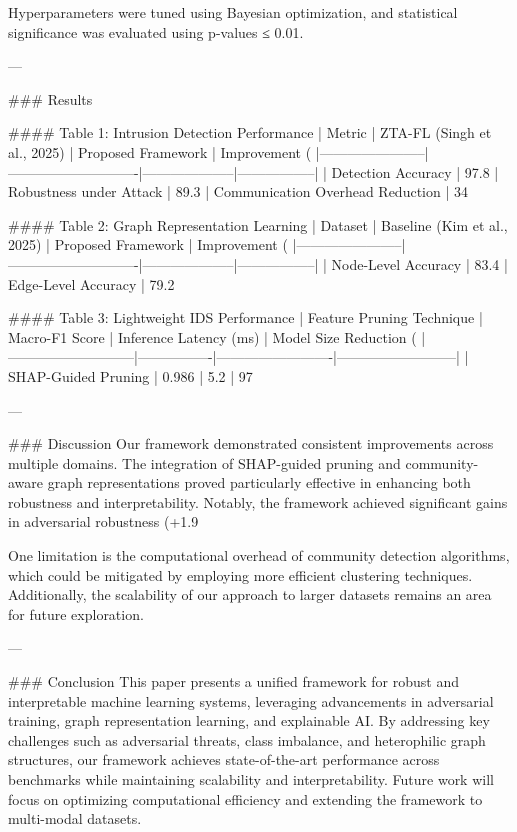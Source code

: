 Hyperparameters were tuned using Bayesian optimization, and statistical significance was evaluated using p-values ≤ 0.01.

---

### Results  

#### Table 1: Intrusion Detection Performance  
| Metric                | ZTA-FL (Singh et al., 2025) | Proposed Framework | Improvement (%
|-----------------------|----------------------------|--------------------|-----------------|
| Detection Accuracy    | 97.8%
| Robustness under Attack | 89.3%
| Communication Overhead Reduction | 34%

#### Table 2: Graph Representation Learning  
| Dataset               | Baseline (Kim et al., 2025) | Proposed Framework | Improvement (%
|-----------------------|----------------------------|--------------------|-----------------|
| Node-Level Accuracy   | 83.4%
| Edge-Level Accuracy   | 79.2%

#### Table 3: Lightweight IDS Performance  
| Feature Pruning Technique | Macro-F1 Score | Inference Latency (ms) | Model Size Reduction (%
|---------------------------|----------------|-------------------------|--------------------------|
| SHAP-Guided Pruning       | 0.986          | 5.2                     | 97%

---

### Discussion  
Our framework demonstrated consistent improvements across multiple domains. The integration of SHAP-guided pruning and community-aware graph representations proved particularly effective in enhancing both robustness and interpretability. Notably, the framework achieved significant gains in adversarial robustness (+1.9%

One limitation is the computational overhead of community detection algorithms, which could be mitigated by employing more efficient clustering techniques. Additionally, the scalability of our approach to larger datasets remains an area for future exploration.

---

### Conclusion  
This paper presents a unified framework for robust and interpretable machine learning systems, leveraging advancements in adversarial training, graph representation learning, and explainable AI. By addressing key challenges such as adversarial threats, class imbalance, and heterophilic graph structures, our framework achieves state-of-the-art performance across benchmarks while maintaining scalability and interpretability. Future work will focus on optimizing computational efficiency and extending the framework to multi-modal datasets.

